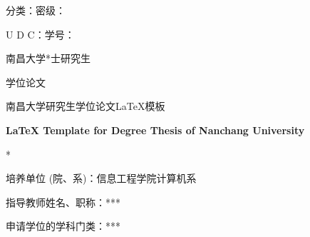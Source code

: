 \documentclass[UTF-8, a4paper, zihao=-4, no-math, openany, oneside]{ctexbook}
\begin{document}
	
\begin{titlepage}

\begin{flushleft}
	
{\heiti 分类：\hfill 密级：\hspace*{6em}}

U D C：\hfill {\heiti 学号：}\hspace*{6em}

\end{flushleft}\vspace*{6ex}
	
\begin{center}

{\heiti \fontsize{16bp}{19.2bp}\selectfont 南\hspace*{0.5em}昌\hspace*{0.5em}大\hspace*{0.5em}学\hspace*{6em}*\hspace*{0.5em}士\hspace*{0.5em}研\hspace*{0.5em}究\hspace*{0.5em}生}\vspace*{4ex}
	
{\heiti \fontsize{24bp}{28.8bp}\selectfont 学位论文}\vspace*{6ex}
	
{\heiti \fontsize{18bp}{21.6bp}\selectfont 南昌大学研究生学位论文\LaTeX 模板}
	
\textbf{\fontsize{14bp}{16.8bp}\selectfont \LaTeX \; Template for Degree Thesis of Nanchang University}\vspace*{6ex}
	
{\fontsize{14bp}{16bp}\selectfont **}

\end{center}

\begin{flushleft}

培\hspace*{0.22em}养\hspace*{0.22em}单\hspace*{0.22em}位\hspace*{0.22em} (院、\hspace*{0.21em}系)：信息工程学院\hspace*{1em}计算机系

指导教师姓名、职称：***\hspace*{1em}

申请学位的学科门类：***


\end{flushleft}
\end{titlepage}
\end{document}
